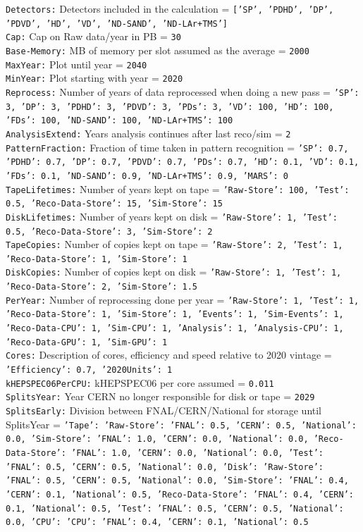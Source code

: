{\tt Detectors:} Detectors included in the calculation = {\tt ['SP', 'PDHD', 'DP', 'PDVD', 'HD', 'VD', 'ND-SAND', 'ND-LAr+TMS']} \\
{\tt Cap:} Cap on Raw data/year in PB = {\tt 30} \\
{\tt Base-Memory:} MB of memory per slot assumed as the average = {\tt 2000} \\
{\tt MaxYear:} Plot until year = {\tt 2040} \\
{\tt MinYear:} Plot starting with year = {\tt 2020} \\
{\tt Reprocess:} Number of years of data reprocessed when doing a new pass = {\tt {'SP': 3, 'DP': 3, 'PDHD': 3, 'PDVD': 3, 'PDs': 3, 'VD': 100, 'HD': 100, 'FDs': 100, 'ND-SAND': 100, 'ND-LAr+TMS': 100}} \\
{\tt AnalysisExtend:} Years analysis continues after last reco/sim = {\tt 2} \\
{\tt PatternFraction:} Fraction of time taken in pattern recognition = {\tt {'SP': 0.7, 'PDHD': 0.7, 'DP': 0.7, 'PDVD': 0.7, 'PDs': 0.7, 'HD': 0.1, 'VD': 0.1, 'FDs': 0.1, 'ND-SAND': 0.9, 'ND-LAr+TMS': 0.9, 'MARS': 0}} \\
{\tt TapeLifetimes:} Number of years kept on tape = {\tt {'Raw-Store': 100, 'Test': 0.5, 'Reco-Data-Store': 15, 'Sim-Store': 15}} \\
{\tt DiskLifetimes:} Number of years kept on disk = {\tt {'Raw-Store': 1, 'Test': 0.5, 'Reco-Data-Store': 3, 'Sim-Store': 2}} \\
{\tt TapeCopies:} Number of copies kept on tape = {\tt {'Raw-Store': 2, 'Test': 1, 'Reco-Data-Store': 1, 'Sim-Store': 1}} \\
{\tt DiskCopies:} Number of copies kept on disk = {\tt {'Raw-Store': 1, 'Test': 1, 'Reco-Data-Store': 2, 'Sim-Store': 1.5}} \\
{\tt PerYear:} Number of reprocessing done per year = {\tt {'Raw-Store': 1, 'Test': 1, 'Reco-Data-Store': 1, 'Sim-Store': 1, 'Events': 1, 'Sim-Events': 1, 'Reco-Data-CPU': 1, 'Sim-CPU': 1, 'Analysis': 1, 'Analysis-CPU': 1, 'Reco-Data-GPU': 1, 'Sim-GPU': 1}} \\
{\tt Cores:} Description of cores, efficiency and speed relative to 2020 vintage = {\tt {'Efficiency': 0.7, '2020Units': 1}} \\
{\tt kHEPSPEC06PerCPU:} kHEPSPEC06 per core assumed = {\tt 0.011} \\
{\tt SplitsYear:} Year CERN no longer responsible for disk or tape = {\tt 2029} \\
{\tt SplitsEarly:} Division between FNAL/CERN/National for storage until SplitsYear = {\tt {'Tape': {'Raw-Store': {'FNAL': 0.5, 'CERN': 0.5, 'National': 0.0}, 'Sim-Store': {'FNAL': 1.0, 'CERN': 0.0, 'National': 0.0}, 'Reco-Data-Store': {'FNAL': 1.0, 'CERN': 0.0, 'National': 0.0}, 'Test': {'FNAL': 0.5, 'CERN': 0.5, 'National': 0.0}}, 'Disk': {'Raw-Store': {'FNAL': 0.5, 'CERN': 0.5, 'National': 0.0}, 'Sim-Store': {'FNAL': 0.4, 'CERN': 0.1, 'National': 0.5}, 'Reco-Data-Store': {'FNAL': 0.4, 'CERN': 0.1, 'National': 0.5}, 'Test': {'FNAL': 0.5, 'CERN': 0.5, 'National': 0.0}}, 'CPU': {'CPU': {'FNAL': 0.4, 'CERN': 0.1, 'National': 0.5}}}} \\
